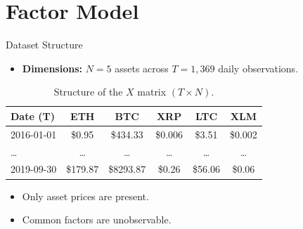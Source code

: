 \documentclass{beamer}
\begin{document}
\section{Factor Model}

\begin{frame}{Dataset Structure}
    \begin{itemize}
        \item \textbf{Dimensions:} $N=5$ assets across $T=1,369$ daily observations.
    \end{itemize}

    \begin{table}[h]
        \centering
        \small
        \begin{tabular}{|l|c|c|c|c|c|}
            \hline
            \textbf{Date (T)}  & \textbf{ETH} &\textbf{BTC}&  \textbf{XRP} & \textbf{LTC}  & \textbf{XLM} \\ \hline
            2016-01-01 & \$0.95 & \$434.33& \$0.006 & \$3.51 & \$0.002 \\ \hline
            \dots & \dots & \dots & \dots & \dots  & \dots \\ \hline
            2019-09-30 & \$179.87 & \$8293.87 & \$0.26 & \$56.06 & \$0.06 \\ \hline
        \end{tabular}
        \caption*{Structure of the $X$ matrix $(T \times N)$.}
    \end{table}

    \begin{itemize}
        \item Only asset prices are present.
        \item Common factors are unobservable.
    \end{itemize}
\end{frame}
\end{document}
